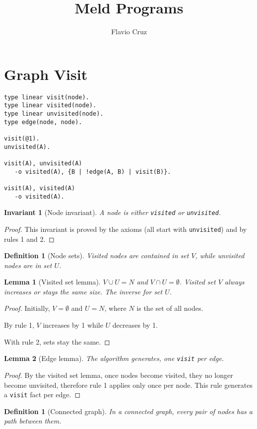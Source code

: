 \documentclass[9pt]{article}
\title{Meld Programs}
\author{Flavio Cruz}
\newtheorem{lemma}{Lemma}
\newtheorem{invariant}{Invariant}
\newtheorem{definition}[theorem]{Definition}
\begin{document}
\section{Graph Visit}

\begin{verbatim}
type linear visit(node).
type linear visited(node).
type linear unvisited(node).
type edge(node, node).

visit(@1).
unvisited(A).

visit(A), unvisited(A)
   -o visited(A), {B | !edge(A, B) | visit(B)}.

visit(A), visited(A)
   -o visited(A).
\end{verbatim}

\begin{invariant}[Node invariant]
A node is either \texttt{visited} or \texttt{unvisited}.
\end{invariant}
\begin{proof}
This invariant is proved by the axioms (all start with \texttt{unvisited}) and by rules 1 and 2.
\end{proof}

\begin{definition}[Node sets]
Visited nodes are contained in set $V$, while unvisited nodes are in set $U$.
\end{definition}

\begin{lemma}[Visited set lemma]
$V \cup U = N$ and $V \cap U = \emptyset$.
Visited set $V$ always increases or stays the same size. The inverse for set $U$.
\end{lemma}
\begin{proof}
Initially, $V = \emptyset$ and $U = N$, where $N$ is the set of all nodes.

By rule 1, $V$ increases by 1 while $U$ decreases by 1.

With rule 2, sets stay the same.
\end{proof}

\begin{lemma}[Edge lemma]
The algorithm generates, one \texttt{visit} per edge.
\end{lemma}
\begin{proof}
By the visited set lemma, once nodes become visited, they no longer become unvisited, therefore rule 1 applies only once per node. This rule generates a \texttt{visit} fact per edge.
\end{proof}

\begin{definition}[Connected graph]
In a connected graph, every pair of nodes has a path between them.
\end{definition}
\end{document}
